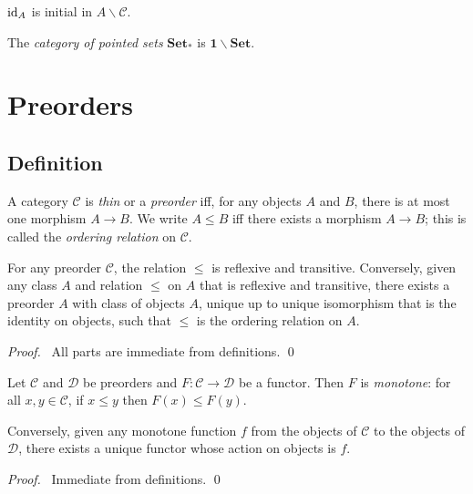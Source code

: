 \begin{ex}
$\mathrm{id}_{A}$ is initial in $A \backslash \mathcal{C}$.
\end{ex}

\begin{ex}
The \emph{category of pointed sets} $\mathbf{Set}_*$ is $\mathbf{1} \backslash \mathbf{Set}$.
\end{ex}

\chapter{Preorders}

\section{Definition}

\begin{df}
A category $\mathcal{C}$ is \emph{thin} or a \emph{preorder} iff, for any objects $A$ and $B$, there is at most one morphism $A \rightarrow B$. We write $A \leq B$ iff there exists a morphism $A \rightarrow B$; this is called the \emph{ordering relation} on $\mathcal{C}$.
\end{df}

\begin{prop}
For any preorder $\mathcal{C}$, the relation $\leq$ is reflexive and transitive. Conversely, given any class $A$ and relation $\leq$ on $A$ that is reflexive and transitive, there exists a preorder $A$ with class of objects $A$, unique up to unique isomorphism that is the identity on objects, such that $\leq$ is the ordering relation on $A$.
\end{prop}

\begin{proof}
\pf\ All parts are immediate from definitions. \qed
\end{proof}

\begin{prop}
Let $\mathcal{C}$ and $\mathcal{D}$ be preorders and $F : \mathcal{C} \rightarrow \mathcal{D}$ be a functor. Then $F$ is \emph{monotone}: for all $x,y \in \mathcal{C}$, if $x \leq y$ then $F(x) \leq F(y)$.

Conversely, given any monotone function $f$ from the objects of $\mathcal{C}$ to the objects of $\mathcal{D}$, there exists a unique functor whose action on objects is $f$.
\end{prop}

\begin{proof}
\pf\ Immediate from definitions. \qed
\end{proof}

